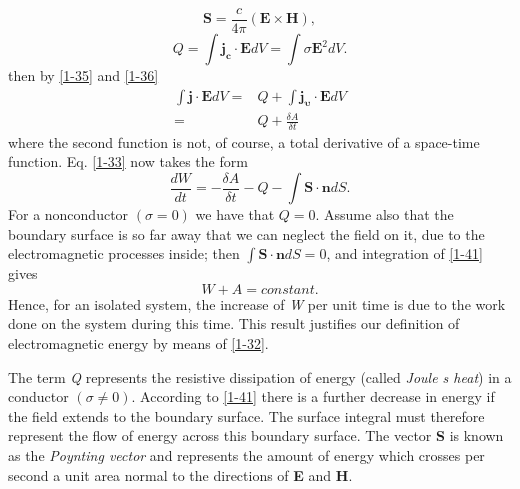 \documentclass[lang=en,11pt]{elegantbook}
\begin{document}
	\begin{equation}
		\mathbf{S}=\frac{c}{4\pi}(\mathbf{E}\times\mathbf{H}),
		\label{1-38}
	\end{equation}
	\begin{equation}
		Q=\int\mathbf{j_c\cdot E}dV=\int\sigma\mathbf{E}^2dV.
		\label{1-39}
	\end{equation}
	then by \eqref{1-35} and \eqref{1-36}
	\begin{equation}
	\begin{aligned}
	\int\mathbf{j\cdot E}dV=&Q+\int\mathbf{j_\upsilon\cdot E}dV\\
	=&Q+\frac{\delta A}{\delta t}
	\end{aligned}
	\label{1-40}	
	\end{equation}
	where the second function is not, of course, a total derivative of a space-time function.
	Eq. \eqref{1-33} now takes the form
	\begin{equation}
		\frac{dW}{dt}=-\frac{\delta A}{\delta t}-Q-\int\mathbf{S\cdot n}dS.
		\label{1-41}
	\end{equation}
	For a nonconductor $(\sigma=0)$ we have that $Q=0$. Assume also that the boundary surface is so far away that we can neglect the field on it, due to the electromagnetic processes inside; then $\int\mathbf{S\cdot n}dS=0$, and integration of \eqref{1-41} gives
	\begin{equation}
		W+A=constant.
		\label{1-42}
	\end{equation}
	Hence, for an isolated system, the increase of \textit{W} per unit time is due to the work done on the system during this time. This result justifies our definition of electromagnetic energy by means of \eqref{1-32}.\par 
	The term \textit{Q} represents the resistive dissipation of energy (called \textit{Joule s heat}) in a conductor $(\sigma\neq 0)$. According to \eqref{1-41} there is a further decrease in energy if the field extends to the boundary surface. The surface integral must therefore represent the flow	of energy across this boundary surface. The vector \textbf{S} is known as the \textit{Poynting vector} and represents the amount of energy which crosses per second a unit area normal to the directions of \textbf{E} and \textbf{H}.\par 
\end{document}
